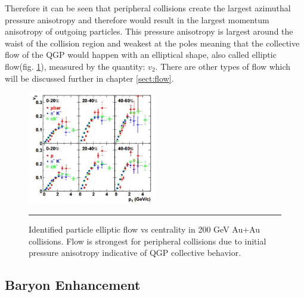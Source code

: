 Therefore it can be seen that peripheral collisions create the largest azimuthal pressure anisotropy and therefore would result in the largest momentum anisotropy of outgoing particles. This pressure anisotropy is largest around the waist of the collision region and weakest at the poles meaning that the collective flow of the QGP would happen with an elliptical shape, also called elliptic flow(fig. \ref{fig:v2auau}), measured by the quantity: $v_2$. There are other types of flow which will be discussed further in chapter \ref{sect:flow}.
    
\begin{figure}[htbp]
\centering
    \includegraphics[width=0.5\textwidth]{prevplots/v2auau.jpg}
\rule{35em}{0.5pt}
	\caption[Identified particle elliptic flow vs centrality in 200 GeV Au+Au collisions]{Identified particle elliptic flow vs centrality in 200 GeV Au+Au collisions. Flow is strongest for peripheral collisions due to initial pressure anisotropy indicative of QGP collective behavior. \citep{Adler:2003kt}}
\label{fig:v2auau}
\end{figure}

\subsection{Baryon Enhancement}

